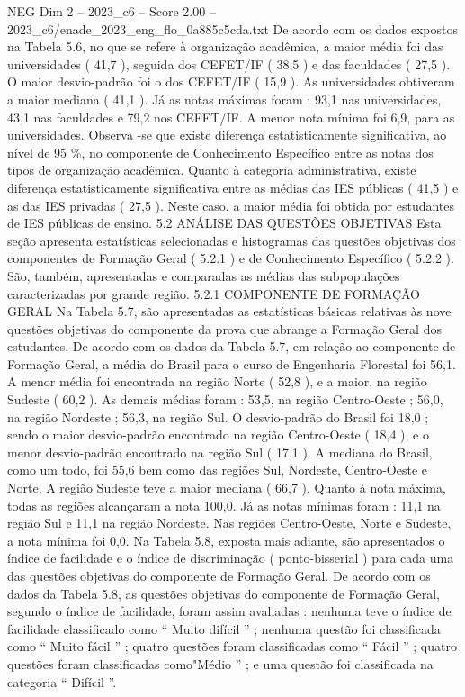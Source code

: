 \begin{textsample}{NEG Dim 2 – 2023\_c6 – Score 2.00 – 2023\_c6/enade\_2023\_eng\_flo\_0a885c5cda.txt}
De acordo com os dados expostos na Tabela 5.6, no que se refere à organização acadêmica, a maior média foi das universidades ( 41,7 ), seguida dos CEFET/IF ( 38,5 ) e das faculdades ( 27,5 ).
O maior desvio-padrão foi o dos CEFET/IF ( 15,9 ).
As universidades obtiveram a maior mediana ( 41,1 ).
Já as notas máximas foram : 93,1 nas universidades, 43,1 nas faculdades e 79,2 nos CEFET/IF.
A menor nota mínima foi 6,9, para as universidades.
Observa -se que existe diferença estatisticamente significativa, ao nível de 95 \%, no componente de Conhecimento Específico entre as notas dos tipos de organização acadêmica.
Quanto à categoria administrativa, existe diferença estatisticamente significativa entre as médias das IES públicas ( 41,5 ) e as das IES privadas ( 27,5 ).
Neste caso, a maior média foi obtida por estudantes de IES públicas de ensino. 5.2 ANÁLISE DAS QUESTÕES OBJETIVAS Esta seção apresenta estatísticas selecionadas e histogramas das questões objetivas dos componentes de Formação Geral ( 5.2.1 ) e de Conhecimento Específico ( 5.2.2 ).
São, também, apresentadas e comparadas as médias das subpopulações caracterizadas por grande região. 5.2.1 COMPONENTE DE FORMAÇÃO GERAL Na Tabela 5.7, são apresentadas as estatísticas básicas relativas às nove questões objetivas do componente da prova que abrange a Formação Geral dos estudantes.
De acordo com os dados da Tabela 5.7, em relação ao componente de Formação Geral, a média do Brasil para o curso de Engenharia Florestal foi 56,1.
A menor média foi encontrada na região Norte ( 52,8 ), e a maior, na região Sudeste ( 60,2 ).
As demais médias foram : 53,5, na região Centro-Oeste ; 56,0, na região Nordeste ; 56,3, na região Sul.
O desvio-padrão do Brasil foi 18,0 ; sendo o maior desvio-padrão encontrado na região Centro-Oeste ( 18,4 ), e o menor desvio-padrão encontrado na região Sul ( 17,1 ).
A mediana do Brasil, como um todo, foi 55,6 bem como das regiões Sul, Nordeste, Centro-Oeste e Norte.
A região Sudeste teve a maior mediana ( 66,7 ).
Quanto à nota máxima, todas as regiões alcançaram a nota 100,0.
Já as notas mínimas foram : 11,1 na região Sul e 11,1 na região Nordeste.
Nas regiões Centro-Oeste, Norte e Sudeste, a nota mínima foi 0,0.
Na Tabela 5.8, exposta mais adiante, são apresentados o índice de facilidade e o índice de discriminação ( ponto-bisserial ) para cada uma das questões objetivas do componente de Formação Geral.
De acordo com os dados da Tabela 5.8, as questões objetivas do componente de Formação Geral, segundo o índice de facilidade, foram assim avaliadas : nenhuma teve o índice de facilidade classificado como “ Muito difícil ” ; nenhuma questão foi classificada como “ Muito fácil ” ; quatro questões foram classificadas como “ Fácil ” ; quatro questões foram classificadas como"Médio ” ; e uma questão foi classificada na categoria “ Difícil ”.

\end{textsample}
